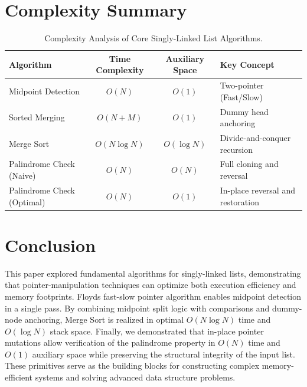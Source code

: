 \documentclass[10pt,journal,compsoc,onecolumn]{IEEEtran}
\begin{document}
\section{Complexity Summary}
\begin{table}[htbp]
\centering
\caption{Complexity Analysis of Core Singly-Linked List Algorithms.}
\label{tab:complexity}
\begin{tabular}{lccl}
\toprule
Algorithm & Time Complexity & Auxiliary Space & Key Concept \\
\midrule
Midpoint Detection & $O(N)$ & $O(1)$ & Two-pointer (Fast/Slow) \\
Sorted Merging & $O(N+M)$ & $O(1)$ & Dummy head anchoring \\
Merge Sort & $O(N \log N)$ & $O(\log N)$ & Divide-and-conquer recursion \\
Palindrome Check (Naive) & $O(N)$ & $O(N)$ & Full cloning and reversal \\
Palindrome Check (Optimal) & $O(N)$ & $O(1)$ & In-place reversal and restoration \\
\bottomrule
\end{tabular}
\end{table}

\section{Conclusion}
This paper explored fundamental algorithms for singly-linked lists, demonstrating that pointer-manipulation techniques can optimize both execution efficiency and memory footprints. Floyds fast-slow pointer algorithm enables midpoint detection in a single pass. By combining midpoint split logic with comparisons and dummy-node anchoring, Merge Sort is realized in optimal $O(N \log N)$ time and $O(\log N)$ stack space. Finally, we demonstrated that in-place pointer mutations allow verification of the palindrome property in $O(N)$ time and $O(1)$ auxiliary space while preserving the structural integrity of the input list. These primitives serve as the building blocks for constructing complex memory-efficient systems and solving advanced data structure problems.
\end{document}
